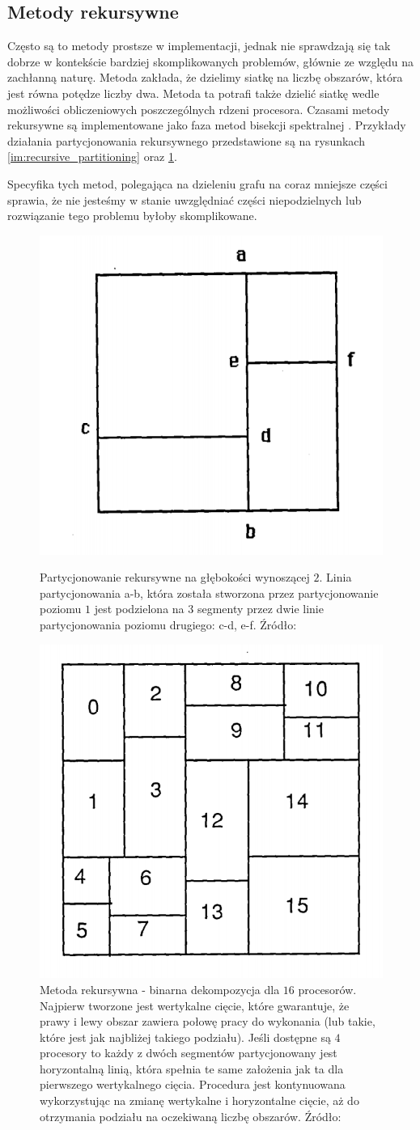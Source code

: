 \newpage
\subsection{Metody rekursywne}

Często są to metody prostsze w implementacji, jednak nie sprawdzają się tak dobrze w kontekście bardziej
skomplikowanych problemów, głównie ze względu na zachłanną naturę.
Metoda \cite{recursive} zakłada, że dzielimy siatkę na liczbę obszarów,
która jest równa potędze liczby dwa. Metoda ta potrafi także dzielić siatkę wedle możliwości obliczeniowych
poszczególnych rdzeni procesora. Czasami metody rekursywne są implementowane jako faza metod
bisekcji spektralnej \cite{10.1137/0611030}.
Przykłady działania partycjonowania rekursywnego przedstawione są na rysunkach
\ref{im:recursive_partitioning} oraz \ref{im:rec_partitioning}.

Specyfika tych metod, polegająca na dzieleniu grafu na coraz mniejsze
części sprawia, że nie jesteśmy w stanie uwzględniać części niepodzielnych lub rozwiązanie tego problemu byłoby skomplikowane.


\begin{figure}[h]
    \centering
    \includegraphics[width=0.3\linewidth]{images/recursive}
    \caption{Partycjonowanie rekursywne na głębokości wynoszącej $2$. Linia partycjonowania a-b, która została stworzona
    przez partycjonowanie poziomu $1$ jest podzielona na $3$ segmenty przez dwie linie partycjonowania poziomu drugiego:
    c-d, e-f. Źródło: \cite{recursive}}
    \label{im:recursive_partitioning}

    \includegraphics[width=0.3\linewidth]{images/recursive-part}
    \caption{Metoda rekursywna - binarna dekompozycja dla $16$ procesorów. Najpierw tworzone jest wertykalne cięcie,
        które gwarantuje, że prawy i lewy obszar
        zawiera połowę pracy do wykonania (lub takie, które jest jak najbliżej takiego podziału). Jeśli dostępne
        są $4$ procesory to każdy z dwóch segmentów partycjonowany jest horyzontalną linią, która spełnia te same założenia
        jak ta dla pierwszego wertykalnego cięcia. Procedura jest kontynuowana wykorzystując na zmianę wertykalne i
        horyzontalne cięcie, aż do otrzymania podziału na oczekiwaną liczbę obszarów. Źródło: \cite{recursive}}
    \label{im:rec_partitioning}
\end{figure}

